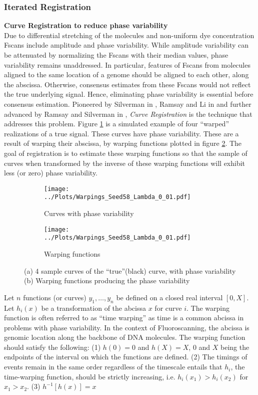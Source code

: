 \subsubsection{Iterated Registration} \label{Sec7_Registration}
\noindent
{\bf{Curve Registration to reduce phase variability }} \\
Due to differential stretching of the molecules and non-uniform dye concentration Fscans include amplitude and phase variability. While amplitude variability can be attenuated by normalizing the Fscans with their median values, phase variability remains unaddressed. In particular, features of Fscans from molecules aligned to the same location of a genome should be aligned to each other, along the abscissa. Otherwise, consensus estimates from these Fscans would not reflect the true underlying signal. Hence, eliminating phase variability is essential before consensus estimation. Pioneered by Silverman in \cite{Silverman_1995_JRSSB}, Ramsay and Li in \cite{Ramsay_Li_1998_JRSSB} and further advanced by Ramsay and Silverman in \cite{Ramsay_2006_Functional}, {\emph{Curve Registration}} is the technique that addresses this problem. Figure \ref{fig:PhaseVar} is a simulated example of four ``warped'' realizations of a true signal. These curves have phase variability. These are a result of warping their abscissa, by warping functions plotted in figure \ref{fig:WarpingFunc}. The goal of registration is to estimate these warping functions so that the sample of curves when transformed by the inverse of these warping functions will exhibit less (or zero) phase variability. 

\begin{figure}
\begin{subfigure}{0.49\linewidth}
\centering
\texttt{[image: ../Plots/Warpings\_Seed58\_Lambda\_0\_01.pdf]}
\caption{Curves with phase variability}
\label{fig:PhaseVar}
\end{subfigure}
\begin{subfigure}{0.49\linewidth}
\centering
\texttt{[image: ../Plots/Warpings\_Seed58\_Lambda\_0\_01.pdf]}
\caption{Warping functions}
\label{fig:WarpingFunc}
\end{subfigure}
\caption{(a) 4 sample curves of the ``true''(black) curve, with phase variability (b) Warping functions producing the phase variability }
\label{fig:ExampleWarping}
\end{figure}

Let $n$ functions (or curves) $y_1, \dots, y_n$ be defined on a closed real interval $[0, X]$. Let $h_i(x)$ be a transformation of the abcissa $x$ for curve $i$. The warping function is often referred to as ``time warping'' as time is a common abcissa in problems with phase variability. In the context of Fluoroscanning, the abcissa is genomic location along the backbone of DNA molecules. The warping function should satisfy the following: (1) $h(0) = 0$ and $h(X) = X$, $0$ and $X$ being the endpoints of the interval on which the functions are defined. (2) The timings of events remain in the same order regardless of the timescale entails that $h_i$, the time-warping function, should be strictly increasing, i.e. $h_i(x_1) > h_i(x_2)$ for $x_1 > x_2$. (3) $h^{-1}[h(x)] = x$


